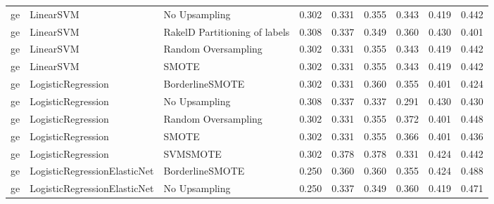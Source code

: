\begin{tabular}{lllllllll}
      ge &                       LinearSVM &                 No Upsampling & 0.302 &                     0.331 &                 0.355 &                  0.343 &                                   0.419 &     0.442 \\
      ge &                       LinearSVM & RakelD Partitioning of labels & 0.308 &                     0.337 &                 0.349 &                  0.360 &                                   0.430 &     0.401 \\
      ge &                       LinearSVM &           Random Oversampling & 0.302 &                     0.331 &                 0.355 &                  0.343 &                                   0.419 &     0.442 \\
      ge &                       LinearSVM &                         SMOTE & 0.302 &                     0.331 &                 0.355 &                  0.343 &                                   0.419 &     0.442 \\
      ge &              LogisticRegression &               BorderlineSMOTE & 0.302 &                     0.331 &                 0.360 &                  0.355 &                                   0.401 &     0.424 \\
      ge &              LogisticRegression &                 No Upsampling & 0.308 &                     0.337 &                 0.337 &                  0.291 &                                   0.430 &     0.430 \\
      ge &              LogisticRegression &           Random Oversampling & 0.302 &                     0.331 &                 0.355 &                  0.372 &                                   0.401 &     0.448 \\
      ge &              LogisticRegression &                         SMOTE & 0.302 &                     0.331 &                 0.355 &                  0.366 &                                   0.401 &     0.436 \\
      ge &              LogisticRegression &                      SVMSMOTE & 0.302 &                     0.378 &                 0.378 &                  0.331 &                                   0.424 &     0.442 \\
      ge &    LogisticRegressionElasticNet &               BorderlineSMOTE & 0.250 &                     0.360 &                 0.360 &                  0.355 &                                   0.424 &     0.488 \\
      ge &    LogisticRegressionElasticNet &                 No Upsampling & 0.250 &                     0.337 &                 0.349 &                  0.360 &                                   0.419 &     0.471 \\

\end{tabular}
